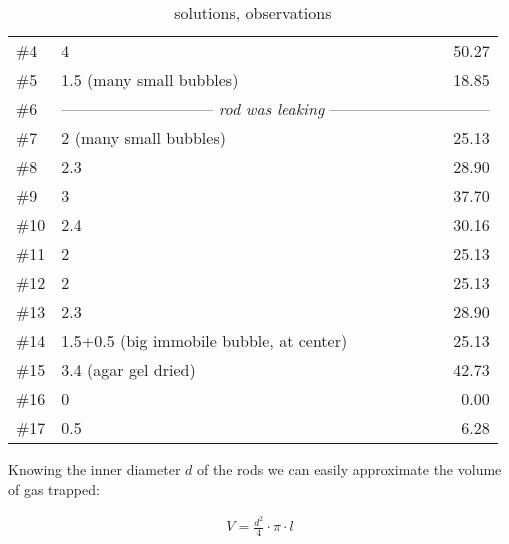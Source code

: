 \begin{table}[]
\begin{tabular}{l|lr}
\#4   & 4					& 50.27				\\
\#5   & 1.5 (many small bubbles)		& 18.85				\\
\#6   & \multicolumn{2}{c}{-----------------------------\textit{ rod was leaking }------------------------------}\\
\#7   & 2 (many small bubbles)			& 25.13				\\
\#8   & 2.3					& 28.90				\\
\#9   & 3					& 37.70				\\
\#10  & 2.4					& 30.16				\\
\#11  & 2					& 25.13				\\
\#12  & 2					& 25.13				\\
\#13  & 2.3					& 28.90				\\
\#14  & 1.5+0.5 (big immobile bubble, at center)	& 25.13				\\
\#15  & 3.4 (agar gel dried)			& 42.73				\\
\#16  & 0					& 0.00				\\
\#17  & 0.5					& 6.28				\\
\bottomrule
\end{tabular}
\caption{solutions, observations}
\label{tab:bubbles}
\end{table}

Knowing the inner diameter $d$ of the rods we can easily approximate the volume of gas trapped:

\begin{align}
 V = \frac{d^2}{4}\cdot \pi \cdot l
\end{align}

